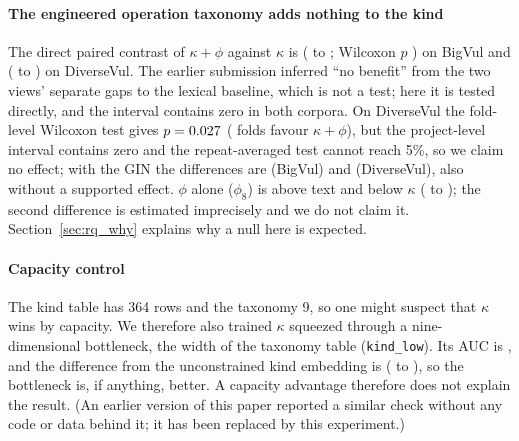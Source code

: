 \paragraph{The engineered operation taxonomy adds nothing to the kind}
The direct paired contrast of $\kappa{+}\phi$ against $\kappa$ is
\cBvGgnnOpKindVKindD{} (\cBvGgnnOpKindVKindLo{} to \cBvGgnnOpKindVKindHi{};
Wilcoxon $p$ \cBvGgnnOpKindVKindW{}) on BigVul and \cDvGgnnOpKindVKindD{}
(\cDvGgnnOpKindVKindLo{} to \cDvGgnnOpKindVKindHi{}) on DiverseVul. The
earlier submission inferred ``no benefit'' from the two views' separate gaps
to the lexical baseline, which is not a test; here it is tested directly, and
the interval contains zero in both corpora. On DiverseVul the fold-level
Wilcoxon test gives $p=0.027{}$ (\cDvGgnnOpKindVKindWins{} folds
favour $\kappa{+}\phi$), but the project-level interval contains zero and the
repeat-averaged test cannot reach 5\%, so we claim no effect; with the GIN the
differences are \cBvGinOpKindVKindD{} (BigVul) and \cDvGinOpKindVKindD{}
(DiverseVul), also without a supported effect. $\phi$ alone ($\phi_8$) is
\cBvGgnnOpVLexD{} above text and \cBvGgnnKindVOpD{} below $\kappa$
(\cBvGgnnKindVOpLo{} to \cBvGgnnKindVOpHi{}); the second difference is
estimated imprecisely and we do not claim it. Section~\ref{sec:rq_why}
explains why a null here is expected.

\paragraph{Capacity control} The kind table has 364 rows and the taxonomy 9, so
one might suspect that $\kappa$ wins by capacity. We therefore also trained
$\kappa$ squeezed through a nine-dimensional bottleneck, the width of the
taxonomy table (\texttt{kind\_low}). Its AUC is \mBvGgnnKindLowAuc{}, and the
difference from the unconstrained kind embedding is \cBvGgnnKindLowVKindD{}
(\cBvGgnnKindLowVKindLo{} to \cBvGgnnKindLowVKindHi{}), so the bottleneck is,
if anything, better. A capacity advantage therefore does not explain the
result. (An earlier version of this paper reported a similar check without any
code or data behind it; it has been replaced by this experiment.)

